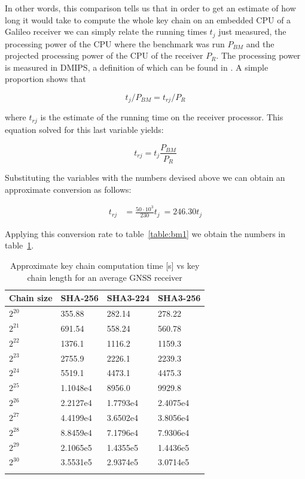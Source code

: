 In other words, this comparison tells us that in order to get an estimate of how
long it would take to compute the whole key chain on an embedded CPU of a
Galileo receiver we can simply relate the running times $t_j$ just measured, the
processing power of the CPU where the benchmark was run $P_{BM}$ and the
projected processing power of the CPU of the receiver $P_R$. The processing
power is measured in DMIPS, a definition of which can be found in \cite{dmips}.
A simple proportion shows that

\begin{equation}
  t_j / P_{BM} = t_{rj} / P_R
\end{equation}

where $t_{rj}$ is the estimate of the running time on the receiver processor. This
equation solved for this last variable yields:

\[
  t_{rj} = t_j \frac{P_{BM}}{P_R}
\]

Substituting the variables with the numbers devised above we can obtain an
approximate conversion as follows:

\begin{equation}
  \label{eq:mips_conv}
  \begin{aligned}
  t_{rj} &= \frac{50 \cdot 10^3}{230} t_j\
        = 246.30 t_j
  \end{aligned}
\end{equation}

Applying this conversion rate to table~\ref{table:bm1} we obtain the numbers in
table~\ref{table:bm1_recv}.

\begin{longtable}[]{@{}llll@{}}
\toprule
Chain size & SHA-256 & SHA3-224 & SHA3-256\tabularnewline
\midrule
\endhead
$2^{20}$ & 355.88 & 282.14 & 278.22\tabularnewline
$2^{21}$ & 691.54 & 558.24 & 560.78\tabularnewline
$2^{22}$ & 1376.1 & 1116.2 & 1159.3\tabularnewline
$2^{23}$ & 2755.9 & 2226.1 & 2239.3\tabularnewline
$2^{24}$ & 5519.1 & 4473.1 & 4475.3\tabularnewline
$2^{25}$ & 1.1048e4 & 8956.0 & 9929.8\tabularnewline
$2^{26}$ & 2.2127e4 & 1.7793e4 & 2.4075e4\tabularnewline
$2^{27}$ & 4.4199e4 & 3.6502e4 & 3.8056e4\tabularnewline
$2^{28}$ & 8.8459e4 & 7.1796e4 & 7.9306e4\tabularnewline
$2^{29}$ & 2.1065e5 & 1.4355e5 & 1.4436e5\tabularnewline
$2^{30}$ & 3.5531e5 & 2.9374e5 & 3.0714e5\tabularnewline
\bottomrule
\caption{Approximate key chain computation time [s] vs key chain length for an
average GNSS receiver}
\label{table:bm1_recv}
\end{longtable}

